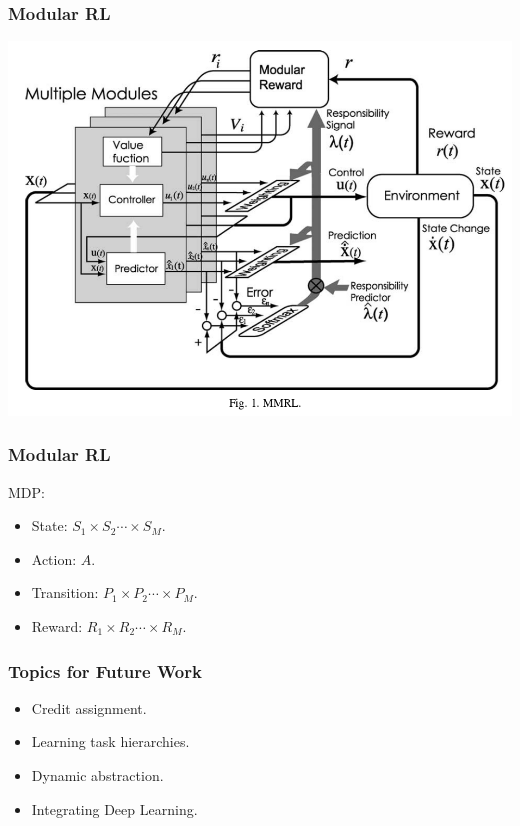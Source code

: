 \documentclass{beamer}
\begin{document}
\begin{frame}
\frametitle{Modular RL}
\includegraphics[width=0.8\columnwidth]{mrl.png}
\end{frame}

\begin{frame}
\frametitle{Modular RL}
MDP:
\begin{itemize}
  \item State: {\color{red}$S_1 \times S_2 \cdots \times S_M $}.
  \item Action: $A$.
  \item Transition: {\color{red}$P_1 \times P_2 \cdots \times P_M $}.
  \item Reward: {\color{red}$R_1 \times R_2 \cdots \times R_M $}.
\end{itemize}
\end{frame}

\begin{frame}
\frametitle{Topics for Future Work}
\begin{itemize}
  \item Credit assignment.
  \item Learning task hierarchies.
  \item Dynamic abstraction. 
  \item Integrating Deep Learning. 
\end{itemize}
\end{frame}
\end{document}
